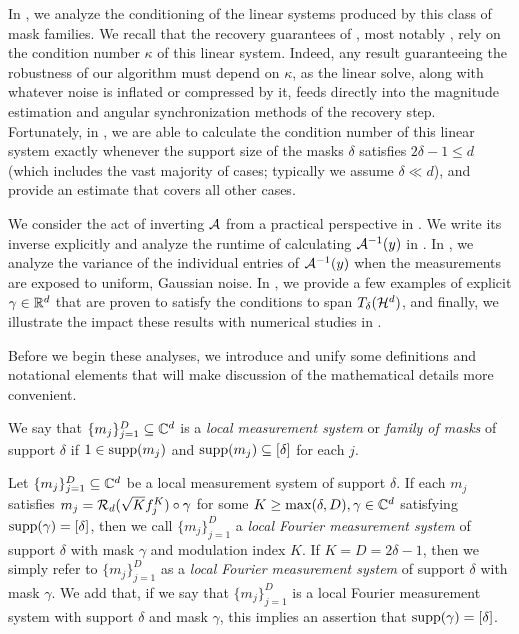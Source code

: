 In , we analyze the conditioning of the linear systems produced by this class of mask families.  We recall that the recovery guarantees of , most notably , rely on the condition number $\kappa$ of this linear system.  Indeed, any result guaranteeing the robustness of our algorithm must depend on $\kappa$, as the linear solve, along with whatever noise is inflated or compressed by it, feeds directly into the magnitude estimation and angular synchronization methods of the recovery step.  Fortunately, in , we are able to calculate the condition number of this linear system exactly whenever the support size of the masks $\delta$ satisfies $2 \delta - 1 \le d$ (which includes the vast majority of cases; typically we assume $\delta \ll d$), and provide an estimate that covers all other cases.

We consider the act of inverting $\mathcal{A}$ from a practical perspective in .  We write its inverse explicitly and analyze the runtime of calculating $\mathcal{A}^{-1}(y)$ in .  In , we analyze the variance of the individual entries of $\mathcal{A}^{-1}(y)$ when the measurements are exposed to uniform, Gaussian noise.  In , we provide a few examples of explicit $\gamma \in \mathbb{R}^d$ that are proven to satisfy the conditions to span $T_\delta(\mathcal{H}^d)$, and finally, we illustrate the impact these results with numerical studies in .

Before we begin these analyses, we introduce and unify some definitions and notational elements that will make discussion of the mathematical details more convenient.

\begin{definition}
  We say that $\{m_j\}_{j = 1}^D \subseteq \mathbb{C}^d$ is a \emph{local measurement system} or \emph{family of masks} of support $\delta$ if $1 \in \operatorname{supp}(m_j)$ and $\operatorname{supp}(m_j) \subseteq [\delta]$ for each $j$. \label{def:loc_meas}
\end{definition}

\begin{definition}
  Let $\{m_j\}_{j = 1}^D \subseteq \mathbb{C}^d$ be a local measurement system of support $\delta$.  If each $m_j$ satisfies $m_j = \mathcal{R}_d(\sqrt{K} f_j^K) \circ \gamma$ for some $K \ge \max(\delta, D), \gamma \in \mathbb{C}^d$ satisfying $\operatorname{supp}(\gamma) = [\delta]$, then we call $\{m_j\}_{j = 1}^D$ a \emph{local Fourier measurement system} of support $\delta$ with mask $\gamma$ and modulation index $K$.  If $K = D = 2 \delta - 1$, then we simply refer to $\{m_j\}_{j = 1}^D$ as a \emph{local Fourier measurement system} of support $\delta$ with mask $\gamma$.  We add that, if we say that $\{m_j\}_{j = 1}^D$ is a local Fourier measurement system with support $\delta$ and mask $\gamma$, this implies an assertion that $\operatorname{supp}(\gamma) = [\delta]$. \label{def:loc_four_meas}
\end{definition}

